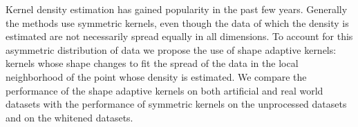 \noindent Kernel density estimation has gained popularity in the past few years. 
Generally the methods use symmetric kernels, even though the data of which the density is estimated are not necessarily spread equally in all dimensions. To account for this asymmetric distribution of data we propose the use of shape adaptive kernels: kernels whose shape changes to fit the spread of the data in the local neighborhood of the point whose density is estimated.
We compare the performance of the shape adaptive kernels on both artificial and real world datasets with the performance of symmetric kernels on the unprocessed datasets and on the whitened datasets.
